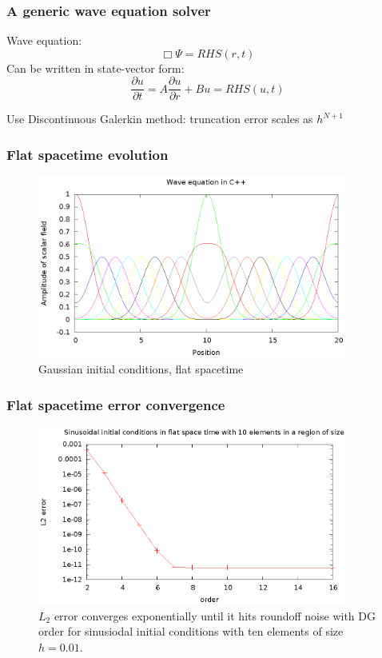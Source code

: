 \documentclass{beamer}
\begin{document}
\begin{frame}
  \frametitle{A generic wave equation solver}
  Wave equation:
  \begin{equation}
    \Box\Psi=RHS(r,t)
  \end{equation}
  Can be written in state-vector form:
  \begin{equation}
  \frac{\partial u}{\partial t} = A\frac{\partial u}{\partial r} + Bu = RHS(u,t)
  \end{equation}

  Use Discontinuous Galerkin method: truncation error scales as $h^{N+1}$
\end{frame}
  
\begin{frame}
  \frametitle{Flat spacetime evolution}
  \begin{figure}
    \includegraphics[width=4.0in]{gaussWave}
    \caption{Gaussian initial conditions, flat spacetime}
  \end{figure}
\end{frame}



\begin{frame}
  \frametitle{Flat spacetime error convergence}
  \begin{figure}
    \includegraphics[width=4.0in]{sinL2WTorder}
    \caption{$L_2$ error converges exponentially until it hits roundoff noise with DG order for sinusiodal initial conditions with ten elements of size $h=0.01$.}
  \end{figure}
\end{frame}
\end{document}
